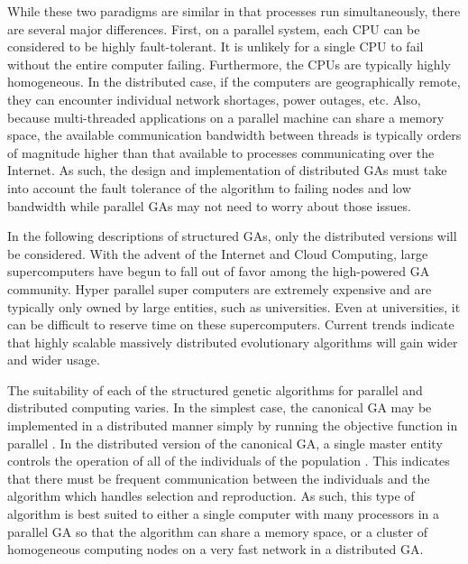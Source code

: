     While these two paradigms are similar in that processes run simultaneously,
      there are several major differences.
    First, on a parallel system, each CPU can be considered to be highly
      fault-tolerant.
    It is unlikely for a single CPU to fail without the entire computer failing.
    Furthermore, the CPUs are typically highly homogeneous.
    In the distributed case, if the computers are geographically remote, they
      can encounter individual network shortages, power outages, etc.
    Also, because multi-threaded applications on a parallel machine can share a
      memory space, the available communication bandwidth between threads is
      typically orders of magnitude higher than that available to processes
      communicating over the Internet. 
    As such, the design and implementation of distributed GAs must take into
      account the fault tolerance of the algorithm to failing nodes and low
      bandwidth while parallel GAs may not need to worry about those issues.

    In the following descriptions of structured GAs, only the distributed versions
      will be considered. 
    With the advent of the Internet and Cloud Computing, large supercomputers
      have begun to fall out of favor among the high-powered GA community.
    Hyper parallel super computers are extremely expensive and are typically only
      owned by large entities, such as universities. 
    Even at universities, it can be difficult to reserve time on these
      supercomputers. 
    Current trends indicate that highly scalable massively distributed
      evolutionary algorithms will gain wider and wider usage.

    The suitability of each of the structured genetic algorithms for parallel
      and distributed computing varies. 
    In the simplest case, the canonical GA may be implemented in a distributed
      manner simply by running the objective function in parallel
      \cite{Schutte2004}. 
    In the distributed version of the canonical GA, a single master entity
      controls the operation of all of the individuals of the population
      \cite{Luque2005}. 
    This indicates that there must be frequent communication between the
      individuals and the algorithm which handles selection and reproduction. 
    As such, this type of algorithm is best suited to either a single computer
      with many processors in a parallel GA so that the algorithm can share a
      memory space, or a cluster of homogeneous computing nodes on a very fast
      network in a distributed GA. 

